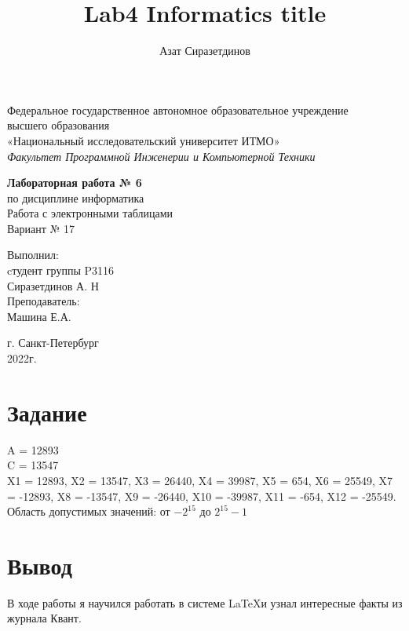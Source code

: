 \documentclass[12pt]{article}
\title{Lab4 Informatics title}
\author{Азат Сиразетдинов}
\begin{document}
	\thispagestyle{empty}
	\begin{center}
		Федеральное государственное автономное образовательное учреждение\\ 
		высшего образования\\
		«Национальный исследовательский университет ИТМО»\\
		\textit{Факультет Программной Инженерии и Компьютерной Техники}\\
	\end{center}
	\vspace{2cm}
	\begin{center}
		\large
		\textbf{Лабораторная работа № 6}\\
		по дисциплине информатика\\
		Работа с электронными таблицами\\
		Вариант № 17
	\end{center}
	\vspace{7cm}
	\begin{flushright}
		Выполнил:\\
		cтудент  группы P3116\\
		Сиразетдинов А. Н\\
		Преподаватель: \\
		Машина Е.А.\\
	\end{flushright}
	\vspace{6cm}
	\begin{center}
		г. Санкт-Петербург\\
		2022г.
	\end{center}
	\newpage
	
	
	
	\tableofcontents
	\newpage
	\section{Задание}
	A = 12893\\
	C = 13547\\
	X1 = 12893, 
	X2 = 13547,
	X3 = 26440, 
	X4 = 39987, 
	X5 = 654, 
	X6 = 25549, 
	X7 = -12893, 
	X8 = -13547, 
	X9 = -26440, 
	X10 = -39987,
	X11 = -654, 
	X12 = -25549.
	Область допустимых значений: от $-2^15$ до $2^15-1$
	\section{Вывод}
	В ходе работы я научился работать в системе \LaTeX и узнал интересные факты из журнала Квант.
\end{document}
